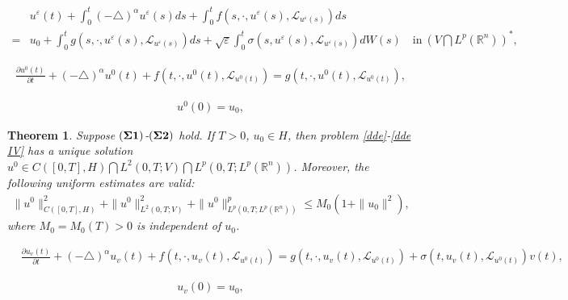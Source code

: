 \documentclass[10pt,a4paper]{amsart}
\newtheorem{theorem}{Theorem}
\def\leq{\leqslant}
\begin{document}
 \begin{align} \label{sfnsol-u}
    & u^\varepsilon (t)
      + \int_0^t (-\triangle)^{\alpha} u^\varepsilon(s) ds
      + \int_0^t f( s, \cdot, u^\varepsilon (s), \mathcal{L}_{u^\varepsilon (s)} )ds
        \nonumber \\
  = & u_0
      + \int_0^t g(s, \cdot, u^\varepsilon (s), \mathcal{L}_{u^\varepsilon (s)}) ds
      + \sqrt{\varepsilon} \int_0^t \sigma(s, u^\varepsilon (s), \mathcal{L}_{u^\varepsilon (s)} ) dW(s)
                                    \quad \text{in} \  \left( V \bigcap L^p(\mathbb{R}^n) \right)^\ast,
 \end{align}

\begin{align}\label{dde}
     \frac{\partial u^0(t)}{\partial t}
      + (-\triangle)^\alpha u^0(t)
      + f(t, \cdot,  u^0(t), \mathcal{L}_{u^0(t)} )
    = g(t, \cdot, u^0(t), \mathcal{L}_{u^0(t)} ),
\end{align}

\begin{align} \label{dde IV}
    u^0(0) = u_0,
\end{align}

\begin{theorem} \label{dde-wellposed}
  Suppose $({\bf \Sigma 1})$-$({\bf \Sigma 2})$ hold.
  If $T>0$, $u_0 \in H$,
  then problem \eqref{dde}-\eqref{dde IV} has a unique solution
    $u^0 \in C([0,T], H)
             \bigcap
             L^2(0,T; V)
             \bigcap
             L^p(0,T; L^p(\mathbb{R}^n ) )$.
 Moreover, the following uniform estimates are valid:
 \begin{align*}
           \| u^0 \|_{C([0,T], H)}^2
           + \| u^0 \|_{L^2(0,T; V)}^2
           + \| u^0 \|_{L^p(0,T; L^p(\mathbb{R}^n ) )}^p
      \leq M_0 \left( 1 + \| u_0 \|^2 \right),
 \end{align*}
 where $M_0 = M_0(T) > 0$ is independent of   $u_0$.
\end{theorem}

\begin{align}\label{contequ}
      & \frac{\partial u_v (t)}{\partial t}
        + (-\triangle)^\alpha u_v (t)
        + f(t, \cdot,  u_v(t), \mathcal{L}_{u^0(t)} )
    =  g(t, \cdot, u_v(t), \mathcal{L}_{u^0(t)} )
        + \sigma(t, u_v (t), \mathcal{L}_{u^0(t)}) v(t),
\end{align}

 \begin{align}\label{contequ IV}
       u_v(0) = u_0,
 \end{align}
\end{document}

